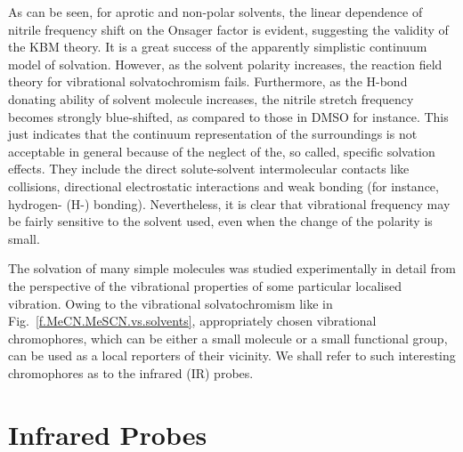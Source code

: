 \documentclass[a4paper,titlepage,twoside,fleqn,12pt]{book}
\begin{document}
\begin{refsection}
As can be seen, for aprotic and non\hyp{}polar solvents, the linear dependence of
nitrile frequency shift on the Onsager factor is evident, suggesting the validity of the KBM theory.
It is a great success of the apparently simplistic continuum model of solvation. 
However, as the solvent polarity increases, the reaction field 
theory for vibrational solvatochromism fails. Furthermore, as the H-bond donating ability of 
solvent molecule increases, the nitrile stretch frequency becomes strongly blue-shifted, as 
compared to those in DMSO for instance. \citep{Wilderen.Luuk.Kern-Michler.Muller-Werkmeister.Bredenbeck.PCCP.2014}
This just indicates that the continuum representation of the surroundings is not acceptable in general
because of the neglect of the, so called, specific solvation effects. 
They include the direct solute\hyp{}solvent intermolecular
contacts like collisions, directional electrostatic interactions and weak bonding (for instance, hydrogen- (H-) bonding).
Nevertheless, it is clear that vibrational frequency may be fairly sensitive 
to the solvent used, even when the change of the polarity is small.

The solvation of many simple molecules was studied experimentally in detail from the perspective of the 
vibrational properties of some particular localised vibration. \citep{Rowlen.Harris.AnalChem.1991,Mayne.Hudson.JPC.1991,
Janroz.Stangret.Lindgren.JACS.1993,Akiyama.Ohtani.SpectchimActA.1994,
Reimers.Hall.JACS.1999,Wilderen.Luuk.Kern-Michler.Muller-Werkmeister.Bredenbeck.PCCP.2014,Jansen.JPCB.2014} 
Owing to the vibrational solvatochromism
like in Fig.~\ref{f.MeCN.MeSCN.vs.solvents}, 
appropriately chosen vibrational chromophores, which can be either a small molecule or a small functional
group, can be used as a local reporters of their vicinity. \citep{Kim.Cho.ChemRev.2013} 
We shall refer to such interesting chromophores as to the infrared (IR) probes. 

\section{Infrared Probes}


\end{refsection}
\end{document}
